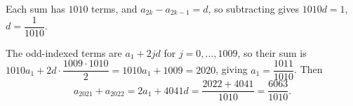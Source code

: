Each sum has $1010$ terms, and $a_{2k}-a_{2k-1}=d$, so subtracting gives $1010d=1$, $d=\dfrac1{1010}$.

The odd-indexed terms are $a_1+2jd$ for $j=0,\dots,1009$, so their sum is $1010a_1+2d\cdot\dfrac{1009\cdot1010}{2}=1010a_1+1009=2020$, giving $a_1=\dfrac{1011}{1010}$. Then
\[a_{2021}+a_{2022}=2a_1+4041d=\dfrac{2022+4041}{1010}=\boxed{\dfrac{6063}{1010}}.\]
